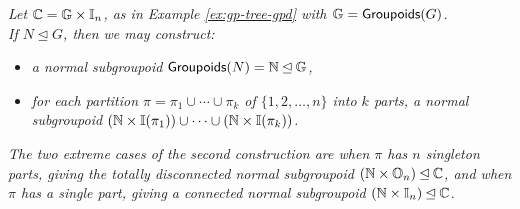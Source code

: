 \begin{example}
\emph{Let $\mathbb{C} = \mathbb{G} \times \mathbb{I}_n$, as in Example \ref{ex:gp-tree-gpd} 
with $\mathbb{G} = {\sf Groupoids}(G)$. \\
If $N \unlhd G$, then we may construct:} 
\begin{itemize}   
\item
\emph{a normal subgroupoid ${\sf Groupoids}(N) = \mathbb{N} \unlhd \mathbb{G}$,}
\item
\emph{for each partition $\pi = \pi_1 \cup \cdots \cup \pi_k$ 
of $\{1,2,\ldots,n\}$ into $k$ parts, a normal subgroupoid 
$(\mathbb{N} \times \mathbb{I}(\pi_1)) \cup \cdots \cup (\mathbb{N} \times \mathbb{I}(\pi_k))$.} 
\end{itemize}  
\emph{The two extreme cases of the second construction 
are when $\pi$ has $n$ singleton parts, 
giving the totally disconnected normal subgroupoid 
$(\mathbb{N} \times \mathbb{O}_n) \unlhd \mathbb{C}$, 
and when $\pi$ has a single part, 
giving a connected normal subgroupoid $(\mathbb{N} \times \mathbb{I}_n) \unlhd \mathbb{C}$.} 
\end{example}

